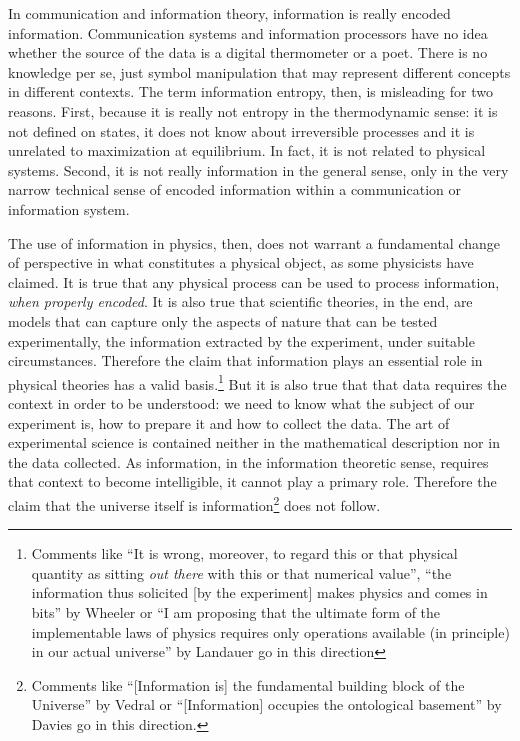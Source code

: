 \documentclass[iopart]{revtex4-1}
\begin{document}
In communication and information theory, information is really encoded information. Communication systems and information processors have no idea whether the source of the data is a digital thermometer or a poet. There is no knowledge per se, just symbol manipulation that may represent different concepts in different contexts. The term information entropy, then, is misleading for two reasons. First, because it is really not entropy in the thermodynamic sense: it is not defined on states, it does not know about irreversible processes and it is unrelated to maximization at equilibrium. In fact, it is not related to physical systems. Second, it is not really information in the general sense, only in the very narrow technical sense of encoded information within a communication or information system.

The use of information in physics, then, does not warrant a fundamental change of perspective in what constitutes a physical object, as some physicists have claimed. It is true that any physical process can be used to process information, \emph{when properly encoded}. It is also true that scientific theories, in the end, are models that can capture only the aspects of nature that can be tested experimentally, the information extracted by the experiment, under suitable circumstances. Therefore the claim that information plays an essential role in physical theories has a valid basis.\footnote{Comments like ``It is wrong, moreover, to regard this or that  physical quantity as sitting \emph{out there} with this or that numerical value'', ``the information thus solicited [by the experiment] makes physics and comes in bits'' by Wheeler\cite{Wheeler} or ``I am proposing that the ultimate form of the implementable laws of physics requires only operations available (in principle) in our actual universe'' by Landauer\cite{Landauer} go in this direction} But it is also true that that data requires the context in order to be understood: we need to know what the subject of our experiment is, how to prepare it and how to collect the data. The art of experimental science is contained neither in the mathematical description nor in the data collected. As information, in the information theoretic sense, requires that context to become intelligible, it cannot play a primary role. Therefore the claim that the universe itself is information\footnote{Comments like ``[Information is] the fundamental building block of the Universe'' by Vedral\cite{Vedral} or ``[Information] occupies the ontological basement'' by Davies\cite{Davies} go in this direction.} does not follow.
\end{document}
